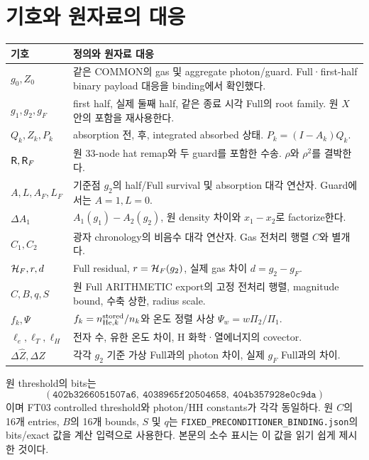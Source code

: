 \appendix
\section{기호와 원자료의 대응}
\begin{longtable}{@{}p{30mm}p{115mm}@{}}
\toprule
기호 & 정의와 원자료 대응\\
\midrule
\endhead
$g_0,Z_0$ & 같은 COMMON의 gas 및 aggregate photon/guard. Full·first-half binary payload 대응을 binding에서 확인했다.\\
$g_1,g_2,g_F$ & first half, 실제 둘째 half, 같은 종료 시각 Full의 root family. 원 $X$ 안의 포함을 재사용한다.\\
$Q_k,Z_k,P_k$ & absorption 전, 후, integrated absorbed 상태. $P_k=(I-A_k)Q_k$.\\
$\mathsf R,\mathsf R_F$ & 원 33-node hat remap와 두 guard를 포함한 수송. $\rho$와 $\rho^2$를 결박한다.\\
$A,L,A_F,L_F$ & 기준점 $g_2$의 half/Full survival 및 absorption 대각 연산자. Guard에서는 $A=1,L=0$.\\
$\Delta A_1$ & $A_1(g_1)-A_2(g_2)$, 원 density 차이와 $x_1-x_2$로 factorize한다.\\
$C_1,C_2$ & 광자 chronology의 비음수 대각 연산자. Gas 전처리 행렬 $C$와 별개다.\\
$\mathcal H_F,r,d$ & Full residual, $r=\mathcal H_F(g_2)$, 실제 gas 차이 $d=g_2-g_F$.\\
$C,B,q,S$ & 원 Full ARITHMETIC export의 고정 전처리 행렬, magnitude bound, 수축 상한, radius scale.\\
$f_k,\Psi$ & $f_k=n_{{\rm He},k}^{\rm stored}/n_k$와 온도 정렬 사상 $\Psi_w=w\Pi_2/\Pi_1$.\\
$\ell_e,\ell_T,\ell_H$ & 전자 수, 유한 온도 차이, H 화학·열에너지의 covector.\\
$\Delta\widehat Z,\Delta Z$ & 각각 $g_2$ 기준 가상 Full과의 photon 차이, 실제 $g_F$ Full과의 차이.\\
\bottomrule
\end{longtable}

원 threshold의 bits는
\[
(\texttt{402b3266051507a6},\ \texttt{4038965f20504658},\
\texttt{404b357928e0c9da})
\]
이며 FT03 controlled threshold와 photon/HH constants가 각각 동일하다.
원 $C$의 16개 entries, $B$의 16개 bounds, $S$ 및 $q$는
\texttt{FIXED\_PRECONDITIONER\_BINDING.json}의 bits/exact 값을 계산 입력으로 사용한다.
본문의 소수 표시는 이 값을 읽기 쉽게 제시한 것이다.

